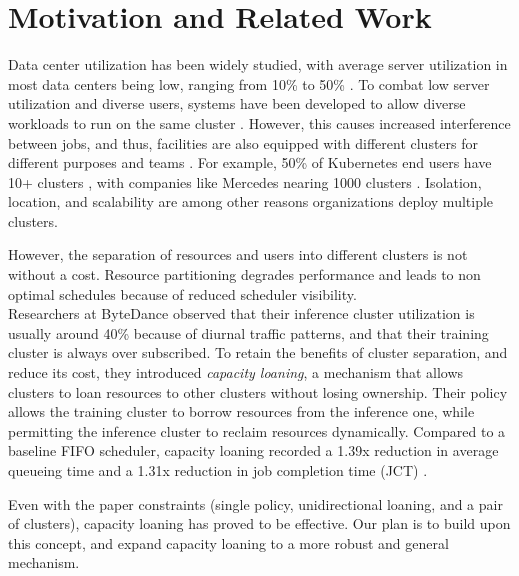 \section{Motivation and Related Work}
Data center utilization has been widely studied, with average server utilization in most data centers being low, 
ranging from 10\% to 50\%
\cite{lo_heracles_2015}. 
To combat low server utilization and diverse users, systems have been developed to allow diverse workloads to run 
on the same cluster \cite{bhattacharya_hierarchical_2013, hindman_mesos_nodate}. 
However, this causes increased interference between jobs, and thus, 
facilities are also equipped with different clusters for different purposes and teams \cite{patel_what_2022, li_lyra_2023}. 
For example, 50\% of Kubernetes \cite{verma_large-scale_2015}
end users have 10+ clusters \cite{noauthor_cncf_2023} 
, with companies like Mercedes nearing 1000 clusters \cite{noauthor_mercedes-benz_2023}.
Isolation, location, and scalability are among other reasons organizations deploy multiple clusters.

However, the separation of resources and users into different clusters is not without a cost. 
Resource partitioning degrades performance %
and leads to non optimal schedules because of reduced scheduler visibility.\\ %

Researchers at ByteDance observed that their inference cluster utilization is usually around 40\% because 
of diurnal traffic patterns, and that their training cluster is always over subscribed. 
To retain the benefits of cluster separation, and reduce its cost, they introduced \textit{capacity loaning}, 
a mechanism that allows clusters to loan resources to other clusters without losing ownership.
Their policy allows the training cluster to borrow resources from the inference one, while permitting the 
inference cluster to reclaim resources dynamically. 
Compared to a baseline FIFO scheduler, capacity loaning recorded a 1.39x reduction in average queueing time and a 1.31x 
reduction in job completion time (JCT) \cite{li_lyra_2023}.

Even with the paper constraints (single policy, unidirectional loaning, and a pair of clusters), capacity loaning has 
proved to be effective. Our plan is to build upon this concept, and expand capacity loaning to a more robust and general 
mechanism. 
